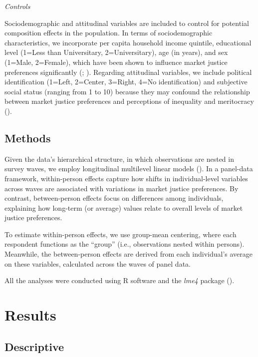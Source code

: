 \documentclass[
  12pt,
]{article}
\begin{document}
\emph{Controls}

Sociodemographic and attitudinal variables are included to control for
potential composition effects in the population. In terms of
sociodemographic characteristics, we incorporate per capita household
income quintile, educational level (1=Less than Universitary,
2=Universitary), age (in years), and sex (1=Male, 2=Female), which have
been shown to influence market justice preferences significantly
(;
). Regarding attitudinal
variables, we include political identification (1=Left, 2=Center,
3=Right, 4=No identification) and subjective social status (ranging from
1 to 10) because they may confound the relationship between market
justice preferences and perceptions of inequality and meritocracy
().

\subsection{Methods}\label{methods}

Given the data's hierarchical structure, in which observations are
nested in survey waves, we employ longitudinal multilevel linear models
(). In a
panel-data framework, within-person effects capture how shifts in
individual-level variables across waves are associated with variations
in market justice preferences. By contrast, between-person effects focus
on differences among individuals, explaining how long-term (or average)
values relate to overall levels of market justice preferences.

To estimate within-person effects, we use group-mean centering, where
each respondent functions as the ``group'' (i.e., observations nested
within persons). Meanwhile, the between-person effects are derived from
each individual's average on these variables, calculated across the
waves of panel data.

All the analyses were conducted using R software and the \emph{lme4}
package ().

\section{Results}\label{results}

\subsection{Descriptive}\label{descriptive}
\end{document}
